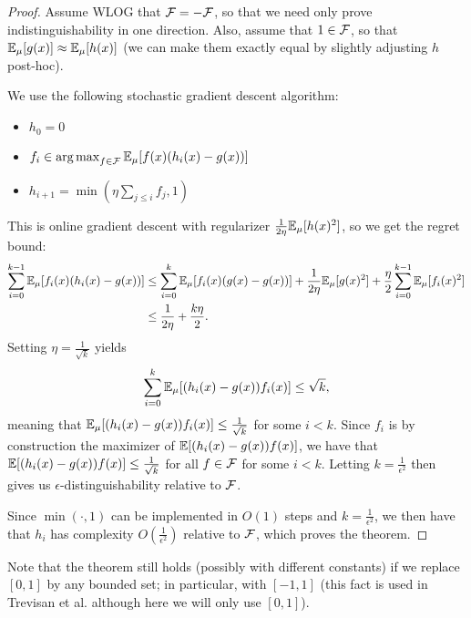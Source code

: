 \documentclass[11pt]{article}
\begin{document}
\begin{proof}
Assume WLOG that $\mathcal{F} = -\mathcal{F}$, so that we need only prove indistinguishability 
in one direction. Also, assume that $1 \in \mathcal{F}$, so that $\mathbb{E}_{\mu}[g(x)] \approx \mathbb{E}_{\mu}[h(x)]$ (we can 
make them exactly equal by slightly adjusting $h$ post-hoc).

We use the following stochastic gradient descent algorithm:
\begin{itemize}
\item $h_0 = 0$
\item $f_i \in \argmax_{f \in \sF} \bE_{\mu}[f(x)(h_i(x)-g(x))]$
\item $h_{i+1} = \min(\eta \sum_{j \leq i} f_j, 1)$
\end{itemize}
This is online gradient descent with regularizer $\frac{1}{2\eta}\mathbb{E}_{\mu}[h(x)^2]$, so we get the regret bound:
\begin{align*}
\sum_{i=0}^{k-1} \mathbb{E}_{\mu}[f_i(x)(h_i(x)-g(x))] &\leq \sum_{i=0}^k \mathbb{E}_{\mu}[f_i(x)(g(x)-g(x))] + \frac{1}{2\eta}\mathbb{E}_{\mu}[g(x)^2] + \frac{\eta}{2}\sum_{i=0}^{k-1} \mathbb{E}_{\mu}[f_i(x)^2] \\
 &\leq \frac{1}{2\eta} + \frac{k\eta}{2}.
\end{align*}
Setting $\eta = \frac{1}{\sqrt{k}}$ yields 
\[ \sum_{i=0}^k \mathbb{E}_{\mu}[(h_i(x)-g(x))f_i(x)] \leq \sqrt{k}, \]
meaning that $\mathbb{E}_{\mu}[(h_i(x)-g(x))f_i(x)] \leq \frac{1}{\sqrt{k}}$ for some $i < k$. 
Since $f_i$ is by construction the maximizer of $\mathbb{E}[(h_i(x)-g(x))f(x)]$, we have that 
$\mathbb{E}[(h_i(x)-g(x))f(x)] \leq \frac{1}{\sqrt{k}}$ for all $f \in \mathcal{F}$ for some $i < k$. Letting 
$k = \frac{1}{\epsilon^2}$ then gives us $\epsilon$-distinguishability relative to $\mathcal{F}$.

Since $\min(\cdot, 1)$ can be implemented in $O(1)$ steps and $k = \frac{1}{\epsilon^2}$, we 
then have that $h_i$ has complexity $O\left(\frac{1}{\epsilon^2}\right)$ relative to $\mathcal{F}$, which 
proves the theorem.
\end{proof}

\begin{remark}
Note that the theorem still holds (possibly with different constants) if we replace $[0,1]$ by any 
bounded set; in particular, with $[-1,1]$ (this fact is used in Trevisan et al. although here we will 
only use $[0,1]$).
\end{remark}
\end{document}
